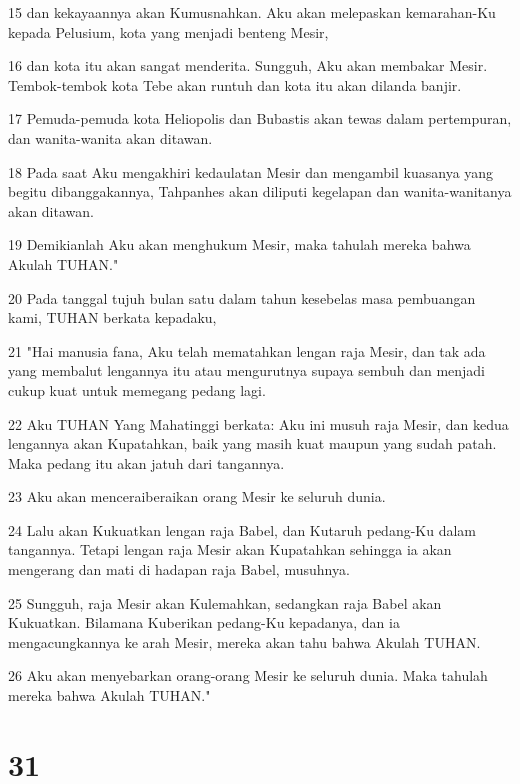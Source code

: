 \par 15 dan kekayaannya akan Kumusnahkan. Aku akan melepaskan kemarahan-Ku kepada Pelusium, kota yang menjadi benteng Mesir,
\par 16 dan kota itu akan sangat menderita. Sungguh, Aku akan membakar Mesir. Tembok-tembok kota Tebe akan runtuh dan kota itu akan dilanda banjir.
\par 17 Pemuda-pemuda kota Heliopolis dan Bubastis akan tewas dalam pertempuran, dan wanita-wanita akan ditawan.
\par 18 Pada saat Aku mengakhiri kedaulatan Mesir dan mengambil kuasanya yang begitu dibanggakannya, Tahpanhes akan diliputi kegelapan dan wanita-wanitanya akan ditawan.
\par 19 Demikianlah Aku akan menghukum Mesir, maka tahulah mereka bahwa Akulah TUHAN."
\par 20 Pada tanggal tujuh bulan satu dalam tahun kesebelas masa pembuangan kami, TUHAN berkata kepadaku,
\par 21 "Hai manusia fana, Aku telah mematahkan lengan raja Mesir, dan tak ada yang membalut lengannya itu atau mengurutnya supaya sembuh dan menjadi cukup kuat untuk memegang pedang lagi.
\par 22 Aku TUHAN Yang Mahatinggi berkata: Aku ini musuh raja Mesir, dan kedua lengannya akan Kupatahkan, baik yang masih kuat maupun yang sudah patah. Maka pedang itu akan jatuh dari tangannya.
\par 23 Aku akan menceraiberaikan orang Mesir ke seluruh dunia.
\par 24 Lalu akan Kukuatkan lengan raja Babel, dan Kutaruh pedang-Ku dalam tangannya. Tetapi lengan raja Mesir akan Kupatahkan sehingga ia akan mengerang dan mati di hadapan raja Babel, musuhnya.
\par 25 Sungguh, raja Mesir akan Kulemahkan, sedangkan raja Babel akan Kukuatkan. Bilamana Kuberikan pedang-Ku kepadanya, dan ia mengacungkannya ke arah Mesir, mereka akan tahu bahwa Akulah TUHAN.
\par 26 Aku akan menyebarkan orang-orang Mesir ke seluruh dunia. Maka tahulah mereka bahwa Akulah TUHAN."

\chapter{31}

